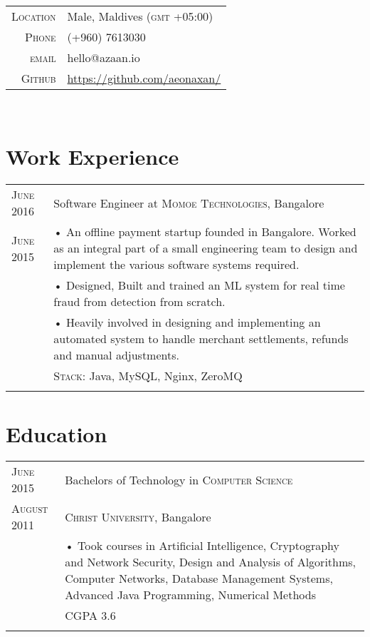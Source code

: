 \documentclass[a4paper,11pt]{article}
\begin{document}
\pagestyle{empty}

\\[25pt]
\begin{tabular}{rl}
    \textsc{Location} & Male, Maldives (\textsc{gmt} +05:00) \\
    \textsc{Phone} & (+960) 7613030 \\
    \textsc{email} & hello@azaan.io
    \\[12pt]
    \textsc{Github} & \url{https://github.com/aeonaxan/}
\end{tabular}
\\[25pt]

\section{Work Experience}
\begin{tabular}{ p{2.5cm} | p{11cm} }
    \textsc{June 2016} & Software Engineer at \textsc{Momoe Technologies}, Bangalore \\
    \textsc{June 2015} 
        & \footnotesize{• An offline payment startup founded in Bangalore. Worked as an integral part of a small engineering team to design and implement the various software systems required.} \\
        & \footnotesize{• Designed, Built and trained an ML system for real time fraud from detection from scratch.} \\
        & \footnotesize{• Heavily involved in designing and implementing an automated system to handle merchant settlements, refunds and manual adjustments.} \\
        & \footnotesize{\textsc{Stack: } Java, MySQL, Nginx, ZeroMQ} \\
    \multicolumn{2}{c}{} \\
\end{tabular}

%
\section{Education}
\begin{tabular}{ p{2.5cm} | p{11cm} }	
 \textsc{June} 2015 & Bachelors of Technology in \textsc{Computer Science} \\ 
 \textsc{August} 2011 & \textsc{Christ University}, Bangalore\\
 & \footnotesize{• Took courses in Artificial Intelligence, Cryptography and Network Security, Design and Analysis of Algorithms, Computer Networks, Database Management Systems, Advanced Java Programming, Numerical Methods} \\
 & \footnotesize{CGPA 3.6} \\
 \multicolumn{2}{c}{} \\
\end{tabular}
\end{document}
